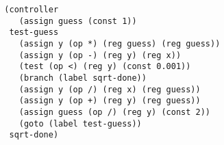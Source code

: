 \documentclass[a4paper,12pt]{article}
\begin{document}
\begin{lstlisting}
  (controller
     (assign guess (const 1))
   test-guess
     (assign y (op *) (reg guess) (reg guess))
     (assign y (op -) (reg y) (reg x))
     (test (op <) (reg y) (const 0.001))
     (branch (label sqrt-done))
     (assign y (op /) (reg x) (reg guess))
     (assign y (op +) (reg y) (reg guess))
     (assign guess (op /) (reg y) (const 2))
     (goto (label test-guess))
   sqrt-done)
\end{lstlisting}
\end{document}
